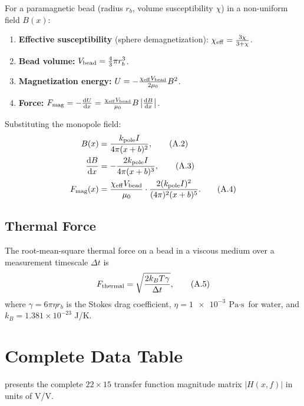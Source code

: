 For a paramagnetic bead (radius $r_b$, volume susceptibility $\chi$) in a
non-uniform field $B(x)$:

\begin{enumerate}
\item \textbf{Effective susceptibility} (sphere demagnetization):
$\chi_\mathrm{eff} = \frac{3\chi}{3 + \chi}$.

\item \textbf{Bead volume:}
$V_\mathrm{bead} = \frac{4}{3}\pi r_b^3$.

\item \textbf{Magnetization energy:}
$U = -\frac{\chi_\mathrm{eff} V_\mathrm{bead}}{2\mu_0} B^2$.

\item \textbf{Force:}
$F_\mathrm{mag} = -\frac{\mathrm{d}U}{\mathrm{d}x}
       = \frac{\chi_\mathrm{eff} V_\mathrm{bead}}{\mu_0} B \left|\frac{\mathrm{d}B}{\mathrm{d}x}\right|$.
\end{enumerate}

Substituting the monopole field:
\begin{align}
B(x) &= \frac{k_\mathrm{pole} I}{4\pi (x+b)^2}, \tag{A.2} \\
\frac{\mathrm{d}B}{\mathrm{d}x} &= -\frac{2k_\mathrm{pole} I}{4\pi (x+b)^3}, \tag{A.3} \\
F_\mathrm{mag}(x) &= \frac{\chi_\mathrm{eff} V_\mathrm{bead}}{\mu_0} \cdot
\frac{2(k_\mathrm{pole} I)^2}{(4\pi)^2 (x+b)^5}. \tag{A.4}
\end{align}

\subsection{Thermal Force}

The root-mean-square thermal force on a bead in a viscous medium over a
measurement timescale $\Delta t$ is
\begin{equation}
F_\mathrm{thermal} = \sqrt{\frac{2 k_B T \gamma}{\Delta t}},
\tag{A.5}
\end{equation}
where $\gamma = 6\pi \eta r_b$ is the Stokes drag coefficient,
$\eta = \SI{1e-3}{\pascal\cdot\second}$ for water, and
$k_B = 1.381 \times 10^{-23}$ J/K.

\section{Complete Data Table}
\label{app:data-table}

 presents the complete $22 \times 15$ transfer function
magnitude matrix $|H(x, f)|$ in units of V/V.

